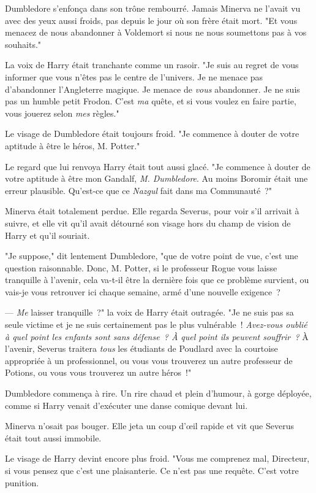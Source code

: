 Dumbledore s'enfonça dans son trône rembourré. Jamais Minerva ne l'avait vu avec des yeux aussi froids, pas depuis le jour où son frère était mort. "Et vous menacez de nous abandonner à Voldemort si nous ne nous soumettons pas à vos souhaits."

La voix de Harry était tranchante comme un rasoir. "Je suis au regret de vous informer que vous n'êtes pas le centre de l'univers. Je ne menace pas d'abandonner l'Angleterre magique. Je menace de \emph{vous} abandonner. Je ne suis pas un humble petit Frodon. C'est \emph{ma} quête, et si vous voulez en faire partie, vous jouerez selon \emph{mes} règles."

Le visage de Dumbledore était toujours froid. "Je commence à douter de votre aptitude à être le héros, M. Potter."

Le regard que lui renvoya Harry était tout aussi glacé. "Je commence à douter de votre aptitude à être mon Gandalf, \emph{M. Dumbledore}. Au moins Boromir était une erreur plausible. Qu'est-ce que ce \emph{Nazgul} fait dans ma Communauté~?"

Minerva était totalement perdue. Elle regarda Severus, pour voir s'il arrivait à suivre, et elle vit qu'il avait détourné son visage hors du champ de vision de Harry et qu'il souriait.

"Je suppose," dit lentement Dumbledore, "que de votre point de vue, c'est une question raisonnable. Donc, M. Potter, si le professeur Rogue vous laisse tranquille à l'avenir, cela va-t-il être la dernière fois que ce problème survient, ou vais-je vous retrouver ici chaque semaine, armé d'une nouvelle exigence~?

--- \emph{Me} laisser tranquille~?" la voix de Harry était outragée. "Je ne suis pas sa seule victime et je ne suis certainement pas le plus vulnérable~! \emph{Avez-vous oublié à quel point les enfants sont sans défense~? À quel point ils peuvent souffrir~?} À l'avenir, Severus traitera \emph{tous} les étudiants de Poudlard avec la courtoise appropriée à un professionnel, ou vous vous trouverez un autre professeur de Potions, ou vous vous trouverez un autre héros~!"

Dumbledore commença à rire. Un rire chaud et plein d'humour, à gorge déployée, comme si Harry venait d'exécuter une danse comique devant lui.

Minerva n'osait pas bouger. Elle jeta un coup d'œil rapide et vit que Severus était tout aussi immobile.

Le visage de Harry devint encore plus froid. "Vous me comprenez mal, Directeur, si vous pensez que c'est une plaisanterie. Ce n'est pas une requête. C'est votre punition.

